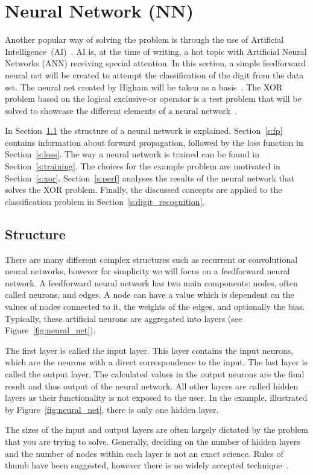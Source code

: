 \section{Neural Network (NN)}\label{s:neural_network}
Another popular way of solving the problem is through the use of Artificial Intelligence~(AI)~\cite{Ciresan2010}. AI is, at the time of writing, a hot topic with Artificial Neural Networks (ANN) receiving special attention.
In this section, a simple feedforward neural net will be created to attempt the classification of the digit from the data set.
The neural net created by Higham will be taken as a basis~\cite{Higham2018}.
The XOR problem based on the logical exclusive-or operator is a test problem that will be solved to showcase the different elements of a neural network~\cite{Shiffman2018}.

In Section~\ref{s:nn:structure} the structure of a neural network is explained.
Section~\ref{s:fp} contains information about forward propagation, followed by the loss function in Section~\ref{s:loss}.
The way a neural network is trained can be found in Section~\ref{s:training}.
The choices for the example problem are motivated in Section~\ref{s:xor}. Section~\ref{s:perf} analyses the results of the neural network that solves the XOR problem.
Finally, the discussed concepts are applied to the classification problem in Section~\ref{s:digit_recognition}.

\subsection{Structure}\label{s:nn:structure}
There are many different complex structures such as recurrent or convolutional neural networks, however for simplicity we will focus on a feedforward neural network.
A feedforward neural network has two main components: nodes, often called neurons, and edges.
A node can have a value which is dependent on the values of nodes connected to it, the weights of the edges, and optionally the bias.
Typically, these artificial neurons are aggregated into layers (see Figure~\ref{fig:neural_net}).

The first layer is called the input layer.
This layer contains the input neurons, which are the neurons with a direct correspondence to the input.
The last layer is called the output layer.
The calculated values in the output neurons are the final result and thus output of the neural network.
All other layers are called hidden layers as their functionality is not exposed to the user.
In the example, illustrated by Figure~\ref{fig:neural_net}, there is only one hidden layer.

The sizes of the input and output layers are often largely dictated by the problem that you are trying to solve.
Generally, deciding on the number of hidden layers and the number of nodes within each layer is not an exact science.
Rules of thumb have been suggested, however there is no widely accepted technique~\cite{Higham2018}.


